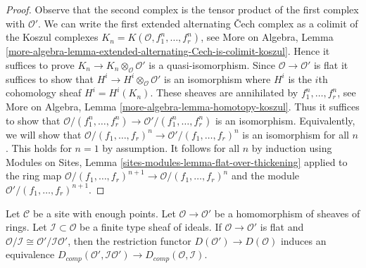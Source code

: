 \begin{proof}
Observe that the second complex is the tensor product of the first
complex with $\mathcal{O}'$. We can write the first extended
alternating {\v C}ech complex as a colimit of the Koszul complexes
$K_n = K(\mathcal{O}, f_1^n, \ldots, f_r^n)$, see
More on Algebra, Lemma
\ref{more-algebra-lemma-extended-alternating-Cech-is-colimit-koszul}.
Hence it suffices to prove $K_n \to K_n \otimes_\mathcal{O} \mathcal{O}'$
is a quasi-isomorphism. Since $\mathcal{O} \to \mathcal{O}'$ is flat
it suffices to show that $H^i \to H^i \otimes_\mathcal{O} \mathcal{O}'$
is an isomorphism where $H^i$ is the $i$th cohomology sheaf
$H^i = H^i(K_n)$. These sheaves are annihilated by $f_1^n, \ldots, f_r^n$, see
More on Algebra, Lemma \ref{more-algebra-lemma-homotopy-koszul}.
Thus it suffices to show that
$\mathcal{O}/(f_1^n, \ldots, f_r^n) \to \mathcal{O}'/(f_1^n, \ldots, f_r^n)$
is an isomorphism. Equivalently, we will show that
$\mathcal{O}/(f_1, \ldots, f_r)^n \to \mathcal{O}'/(f_1, \ldots, f_r)^n$
is an isomorphism for all $n$. This holds for $n = 1$ by assumption.
It follows for all $n$ by induction using
Modules on Sites, Lemma \ref{sites-modules-lemma-flat-over-thickening}
applied to the ring map
$\mathcal{O}/(f_1, \ldots, f_r)^{n + 1} \to \mathcal{O}/(f_1, \ldots, f_r)^n$
and the module $\mathcal{O}'/(f_1, \ldots, f_r)^{n + 1}$.
\end{proof}

\begin{lemma}
\label{lemma-restriction-derived-complete-equivalence}
Let $\mathcal{C}$ be a site with enough points.
Let $\mathcal{O} \to \mathcal{O}'$ be a
homomorphism of sheaves of rings. Let $\mathcal{I} \subset \mathcal{O}$
be a finite type sheaf of ideals.
If $\mathcal{O} \to \mathcal{O}'$ is flat and
$\mathcal{O}/\mathcal{I} \cong \mathcal{O}'/\mathcal{I}\mathcal{O}'$,
then the restriction functor $D(\mathcal{O}') \to D(\mathcal{O})$
induces an equivalence
$D_{comp}(\mathcal{O}', \mathcal{I}\mathcal{O}') \to
D_{comp}(\mathcal{O}, \mathcal{I})$.
\end{lemma}

